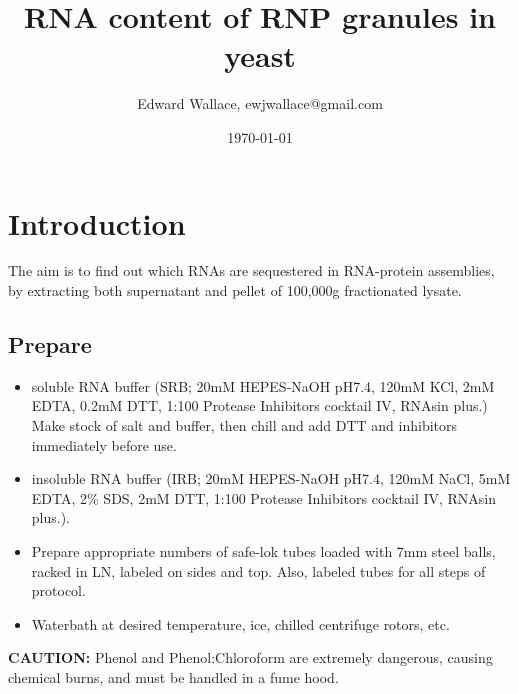 \documentclass{article}
\begin{document}
\title{RNA content of RNP granules in yeast}
\author{Edward Wallace, ewjwallace@gmail.com}
\date{\today}
\maketitle


\section*{Introduction}

The aim is to find out which RNAs are sequestered in RNA-protein assemblies, by extracting both supernatant and pellet of 100,000g fractionated lysate. %

\subsection*{Prepare}

\begin{itemize}
  \item soluble RNA buffer (SRB; 20mM HEPES-NaOH pH7.4, 120mM KCl, 2mM EDTA, 0.2mM DTT, 1:100 Protease Inhibitors cocktail IV, RNAsin plus.) Make stock of salt and buffer, then chill and add DTT and inhibitors immediately before use.
  \item insoluble RNA buffer (IRB; 20mM HEPES-NaOH pH7.4, 120mM NaCl, 5mM EDTA, 2\% SDS, 2mM DTT, 1:100 Protease Inhibitors cocktail IV, RNAsin plus.). 
  \item Prepare appropriate numbers of safe-lok tubes loaded with 7mm steel balls, racked in LN, labeled on sides and top. Also, labeled tubes for all steps of protocol.
  \item Waterbath at desired temperature, ice, chilled centrifuge rotors, etc.
\end{itemize}

\textbf{CAUTION:} Phenol and Phenol:Chloroform are extremely dangerous, causing chemical burns, and must be handled in a fume hood.
\end{document}
